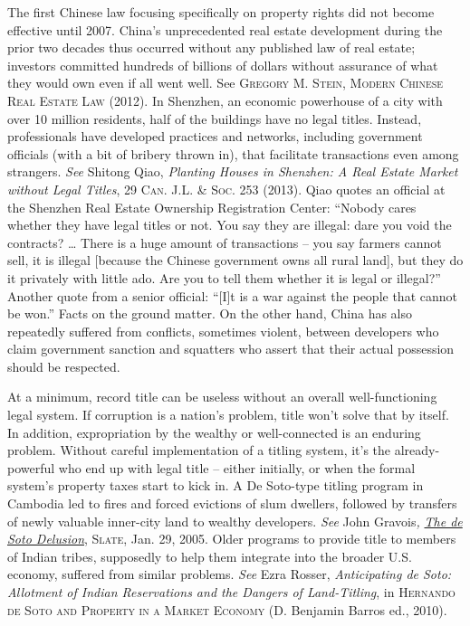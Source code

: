 The first Chinese law focusing specifically on property rights did not become
effective until 2007. China's unprecedented real estate development during the
prior two decades thus occurred without any published law of real estate;
investors committed hundreds of billions of dollars without assurance of what
they would own even if all went well. See \textsc{Gregory M. Stein, Modern
Chinese Real Estate Law} (2012). In Shenzhen, an economic powerhouse of a city
with over 10 million residents, half of the buildings have no legal titles.
Instead, professionals have developed practices and networks, including
government officials (with a bit of bribery thrown in), that facilitate
transactions even among strangers. \textit{See} Shitong Qiao, \textit{Planting
Houses in Shenzhen: A Real Estate Market without Legal Titles}, 29 \textsc{Can.
J.L. \& Soc. }253 (2013). Qiao quotes an official at the Shenzhen Real Estate
Ownership Registration Center: ``Nobody cares whether they have legal titles or
not. You say they are illegal: dare you void the contracts? \dots{} There is a
huge amount of transactions -- you say farmers cannot sell, it is illegal
[because the Chinese government owns all rural land], but they do it privately
with little ado. Are you to tell them whether it is legal or illegal?'' Another
quote from a senior official: ``[I]t is a war against the people that cannot be
won.'' Facts on the ground matter. On the other hand, China has also repeatedly
suffered from conflicts, sometimes violent, between developers who claim
government sanction and squatters who assert that their actual possession
should be respected.

At a minimum, record title can be useless without an overall well-functioning
legal system. If corruption is a nation's problem, title won't solve that by
itself. In addition, expropriation by the wealthy or well-connected is an
enduring problem. Without careful implementation of a titling system, it's the
already-powerful who end up with legal title -- either initially, or when the
formal system's property taxes start to kick in. A De Soto-type titling program
in Cambodia led to fires and forced evictions of slum dwellers, followed by
transfers of newly valuable inner-city land to wealthy developers. \textit{See}
John Gravois\textit{,
}\href{http://www.slate.com/articles/news_and_politics/hey_wait_a_minute/2005/01/the_de_soto_delusion.html}{\textit{The
de Soto Delusion}}, \textsc{Slate}, Jan. 29, 2005. Older programs to provide
title to members of Indian tribes, supposedly to help them integrate into the
broader U.S. economy, suffered from similar problems. \textit{See} Ezra Rosser,
\textit{Anticipating de Soto: Allotment of Indian Reservations and the Dangers
of Land-Titling}, in \textsc{Hernando de Soto and Property in a Market Economy}
(D. Benjamin Barros ed., 2010). 

